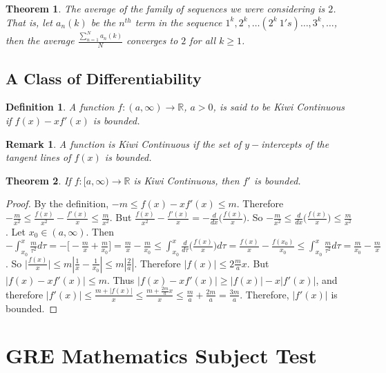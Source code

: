 \documentclass[oneside]{book}
\theoremstyle{mystyle}
\newtheorem{theorem}{Theorem}[section]
\newtheorem{definition}{Definition}[section]
\newtheorem{remark}{Remark}[section]
\begin{document}
%
\begin{theorem}
The average of the family of sequences we were considering is $2$. That is, let $a_n(k)$ be the $n^{th}$ term in the sequence $1^k, 2^k, \hdots (2^k\ 1's)\hdots,3^k,\hdots$, then the average $\frac{\sum_{n=1}^{N} a_n(k)}{N}$ converges to $2$ for all $k\geq 1$.
\end{theorem}
%
\section{A Class of Differentiability}
%
\begin{definition}
A function $f:(a,\infty)\rightarrow \mathbb{R}$, $a>0$, is said to be Kiwi Continuous if $f(x)-xf'(x)$ is bounded.
\end{definition}
%
\begin{remark}
A function is Kiwi Continuous if the set of $y-$intercepts of the tangent lines of $f(x)$ is bounded. 
\end{remark}

\begin{theorem}
If $f:[a,\infty)\rightarrow \mathbb{R}$ is Kiwi Continuous, then $f'$ is bounded.
\end{theorem}
\begin{proof}
By the definition, $-m \leq f(x)-xf'(x)\leq m$. Therefore $-\frac{m}{x^2} \leq \frac{f(x)}{x^2}- \frac{f'(x)}{x} \leq \frac{m}{x^2}$. But $\frac{f(x)}{x^2} - \frac{f'(x)}{x} = -\frac{d}{dx}\big(\frac{f(x)}{x}\big)$. So $-\frac{m}{x^2} \leq \frac{d}{dx}\big(\frac{f(x)}{x}\big) \leq \frac{m}{x^2}$. Let $x_0 \in (a,\infty)$. Then $-\int_{x_0}^x \frac{m}{\tau^2}d\tau = -\big[-\frac{m}{x}+ \frac{m}{x_0}\big] = \frac{m}{x}- \frac{m}{x_0} \leq \int_{x_0}^{x}\frac{d}{d\tau}\big(\frac{f(x)}{x}\big)d\tau = \frac{f(x)}{x} - \frac{f(x_0)}{x_0} \leq \int_{x_0}^{x} \frac{m}{\tau^2}d\tau = \frac{m}{x_0} - \frac{m}{x}$. So $\big|\frac{f(x)}{x}\big| \leq m|\frac{1}{x} - \frac{1}{x_0}| \leq m|\frac{2}{a}|$. Therefore $|f(x)| \leq 2\frac{m}{a}x$. But $|f(x) - xf'(x)| \leq m$. Thus $|f(x)-xf'(x)| \geq |f(x)| - x|f'(x)|$, and therefore $|f'(x)|  \leq \frac{m+|f(x)|}{x} \leq \frac{m+ \frac{2m}{a}x}{x} \leq \frac{m}{a} + \frac{2m}{a} = \frac{3m}{a}$. Therefore, $|f'(x)|$ is bounded.
\end{proof}
%
\chapter{GRE Mathematics Subject Test}
\end{document}
